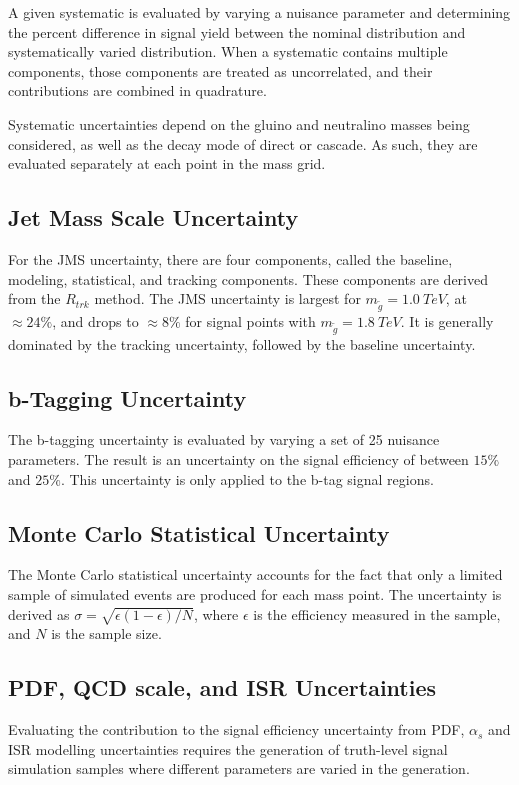 A given systematic is evaluated by varying a nuisance parameter and
determining the percent difference in signal yield between the nominal
distribution and systematically varied distribution.
When a systematic contains multiple components, those components are treated as
uncorrelated, and their contributions are combined in quadrature.

Systematic uncertainties depend on the gluino and neutralino masses
being considered, as well as the decay mode of direct or cascade. As
such, they are evaluated separately at each point in the mass grid.

\subsection{Jet Mass Scale Uncertainty}\label{subsec:signal_jms_uncertainty}
For the JMS uncertainty, there are four components, called the
baseline, modeling, statistical, and tracking components.
These components are derived from the $R_{trk}$ method\cite{rtrk-method}.
The JMS uncertainty is largest for $m_{\tilde{g}}=1.0~TeV$, at $\approx 24\%$, and drops to $\approx 8\%$
for signal points with $m_{\tilde{g}}=1.8~TeV$.
It is generally dominated by the tracking uncertainty, followed by the baseline uncertainty.

\subsection{b-Tagging Uncertainty}\label{subsec:signal_btag_uncertainty}
The b-tagging uncertainty is evaluated by varying a set of 25 nuisance parameters.
The result is an uncertainty on the signal efficiency of between $15\%$ and $25\%$.
This uncertainty is only applied to the b-tag signal regions.

\subsection{Monte Carlo Statistical Uncertainty}\label{subsec:signal_mc_uncertainty}
The Monte Carlo statistical uncertainty accounts for the fact that only a limited sample of simulated events are
produced for each mass point.
The uncertainty is derived as $\sigma=\sqrt{\epsilon(1-\epsilon)/N}$, where $\epsilon$ is the
efficiency measured in the sample, and $N$ is the sample size.


\subsection{PDF, QCD scale, and ISR Uncertainties}\label{subsec:signal_qcd_uncertainty}
Evaluating the contribution to the signal efficiency uncertainty from PDF, $\alpha_s$ and ISR modelling uncertainties
requires the generation of truth-level signal simulation samples where different parameters are varied in the generation.


